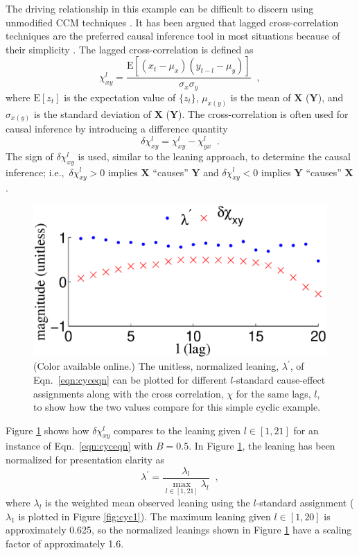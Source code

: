 \documentclass[twocolumn,aps,pre,groupedaddress]{revtex4-1}
\begin{document}
The driving relationship in this example can be difficult to discern using unmodified CCM techniques \cite{Weigel2014}.  It has been argued that lagged cross-correlation techniques are the preferred causal inference tool in most situations because of their simplicity \cite{McNames2007}.  The lagged cross-correlation is defined as
\begin{equation}
\chi_{xy}^l = \frac{\mathrm{E}\left[\left(x_t-\mu_x\right)\left(y_{t-l}-\mu_y\right)\right]}{\sigma_x\sigma_y}\;\;,
\end{equation}
where $\mathrm{E}[z_t]$ is the expectation value of $\{z_t\}$, $\mu_{x(y)}$ is the mean of $\mathbf{X}$ ($\mathbf{Y}$), and $\sigma_{x(y)}$ is the standard deviation of $\mathbf{X}$ ($\mathbf{Y}$).  The cross-correlation is often used for causal inference by introducing a difference quantity \cite{Rogosa1980}
\begin{equation}
\delta\chi_{xy}^l = \chi_{xy}^l - \chi_{yx}^l\;\;.
\end{equation}
The sign of $\delta\chi_{xy}^l$ is used, similar to the leaning approach, to determine the causal inference; i.e.,\  $\delta\chi_{xy}^l>0$ implies $\mathbf{X}$ ``causes'' $\mathbf{Y}$ and $\delta\chi_{xy}^l<0$ implies $\mathbf{Y}$ ``causes'' $\mathbf{X}$ \cite{Rogosa1980}.  

\begin{figure}[ht]
\includegraphics[scale=0.47]{SimpleCyclicexample_difflags.eps}
\caption{(Color available online.) The unitless, normalized leaning, $\lambda^\prime$, of Eqn.\ \ref{eqn:cyceqn} can be plotted for different $l$-standard cause-effect assignments along with the cross correlation, $\chi$ for the same lags, $l$, to show how the two values compare for this simple cyclic example.}
\label{fig:cyc2}
\end{figure}
Figure \ref{fig:cyc2} shows how $\delta\chi_{xy}^l$ compares to the leaning given $l\in[1,21]$ for an instance of Eqn.\ \ref{eqn:cyceqn} with $B=0.5$.  In Figure \ref{fig:cyc2}, the leaning has been normalized for presentation clarity as
\begin{equation}
\lambda^\prime = \frac{\lambda_l}{\max_{l\in[1,21]} \lambda_l}\;\;,
\end{equation}
where $\lambda_l$ is the weighted mean observed leaning using the $l$-standard assignment ($\lambda_1$ is plotted in Figure \ref{fig:cyc1}).  The maximum leaning given $l\in[1,20]$ is approximately 0.625, so the normalized leanings shown in Figure \ref{fig:cyc2} have a scaling factor of approximately 1.6.  
\end{document}
